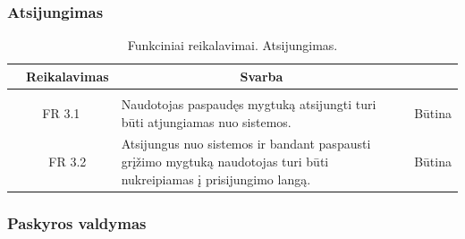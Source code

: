 \documentclass{VUMIFPSkursinis}
\begin{document}
\subsubsection{Atsijungimas}

\begin{table}[H]
	\caption{Funkciniai reikalavimai. Atsijungimas.}
	\begin{tabular}{|p{1cm}|p{1cm}|p{}|p{}|}
		\hline 
		\rowcolor{gray!50}
		\multicolumn{2}{|c|}{{\bfseries Kodas}}&
		\multicolumn{1}{c|}{{\bfseries Reikalavimas}}&
		\multicolumn{1}{c|}{{\bfseries Svarba}}\\
		\hline
		\rowcolor{lightgray}
		\multicolumn{4}{|c|}{Atsijungimas}\\		
		
		\hline
		\multicolumn{2}{|c|}{FR 3.1}&
		{Naudotojas paspaudęs mygtuką atsijungti turi būti atjungiamas nuo sistemos.
		}&		
		\multicolumn{1}{c|}{Būtina}\\
		\hline
		\multicolumn{1}{|c}{}&
		\multicolumn{1}{c|}{FR 3.2}&
		{Atsijungus nuo sistemos ir bandant paspausti grįžimo mygtuką naudotojas turi būti nukreipiamas į prisijungimo langą.
		}&		
		\multicolumn{1}{c|}{Būtina}\\
		\hline
	\end{tabular}		
\end{table}

\subsubsection{Paskyros valdymas}
\end{document}
